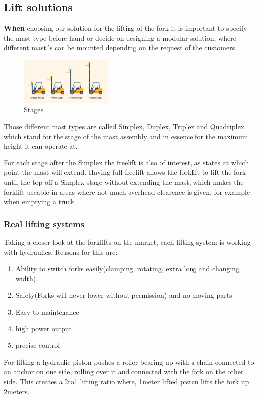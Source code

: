 \documentclass[../report.tex]{subfiles}
\begin{document}
\subsection{Lift solutions}
\textbf{When} choosing our solution for the lifting of the fork it is important to specify the mast type
before hand or decide on designing a modular solution, where different mast´s can be mounted 
depending on the request of the customers. 

\begin{figure}
    \begin{center}
        \includegraphics[width=0.40\textwidth]{../image/types-of-forklift-masts-1.jpg}
        \caption{Stages}
    \end{center}
\end{figure}
Those different mast types are called Simplex, Duplex, Triplex and Quadriplex which stand for the stage of
the mast assembly and in essence for the maximum height it can operate at.

For each stage after the Simplex the freelift is also of interest, as states at which point the mast 
will extend. Having full freelift allows the forklift to lift the fork until the top off a Simplex stage
without extending the mast, which makes the forklift useable in areas where not much overhead clearence is given,
for example when emptying a truck. 

\subsubsection{Real lifting systems}
Taking a closer look at the forklifts on the market, each lifting system is working with hydraulics. 
Reasons for this are:
\begin{enumerate}
    \item Ability to switch forks easily(clamping, rotating, extra long and changing width)
    \item Safety(Forks will never lower without permission) and no moving parts 
    \item Easy to maintenance 
    \item high power output
    \item precise control
\end{enumerate}
For lifting a hydraulic piston pushes a roller bearing up with a chain connected to an anchor on one side, rolling over 
it and connected with the fork on the other side. This creates a 2to1 lifting ratio where, 1meter lifted piston lifts the 
fork up 2meters.
\end{document}
